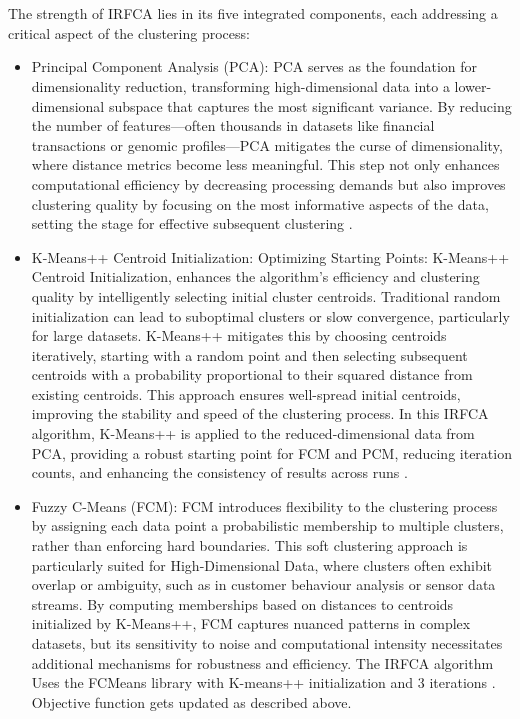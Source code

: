 \documentclass[twoside,11pt]{article}
\renewcommand{\cite}{\citep}
\begin{document}
\\\\
The strength of IRFCA lies in its five integrated components, each addressing a critical aspect of the clustering process:
    \begin{itemize}[nosep]
        \item Principal Component Analysis (PCA): PCA serves as the foundation for dimensionality reduction, transforming high-dimensional data into a lower-dimensional subspace that captures the most significant variance. By reducing the number of features—often thousands in datasets like financial transactions or genomic profiles—PCA mitigates the curse of dimensionality, where distance metrics become less meaningful. This step not only enhances computational efficiency by decreasing processing demands but also improves clustering quality by focusing on the most informative aspects of the data, setting the stage for effective subsequent clustering \cite{chang2025}\cite{gewers2021}.
        \item K-Means++ Centroid Initialization: Optimizing Starting Points: K-Means++ Centroid Initialization, enhances the algorithm’s efficiency and clustering quality by intelligently selecting initial cluster centroids. Traditional random initialization can lead to suboptimal clusters or slow convergence, particularly for large datasets. K-Means++ mitigates this by choosing centroids iteratively, starting with a random point and then selecting subsequent centroids with a probability proportional to their squared distance from existing centroids. This approach ensures well-spread initial centroids, improving the stability and speed of the clustering process. In this IRFCA algorithm, K-Means++ is applied to the reduced-dimensional data from PCA, providing a robust starting point for FCM and PCM, reducing iteration counts, and enhancing the consistency of results across runs \cite{wang2019}\cite{cabrera2019}.
        \item Fuzzy C-Means (FCM): FCM introduces flexibility to the clustering process by assigning each data point a probabilistic membership to multiple clusters, rather than enforcing hard boundaries. This soft clustering approach is particularly suited for High-Dimensional Data, where clusters often exhibit overlap or ambiguity, such as in customer behaviour analysis or sensor data streams. By computing memberships based on distances to centroids initialized by K-Means++, FCM captures nuanced patterns in complex datasets, but its sensitivity to noise and computational intensity necessitates additional mechanisms for robustness and efficiency. The IRFCA algorithm Uses the FCMeans library with K-means++ initialization and 3 iterations \cite{bezdek1984, yu2004}. Objective function gets updated as described above.

\end{itemize}
\end{document}

